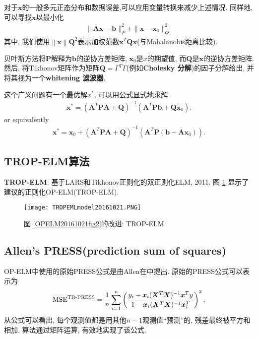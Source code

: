 对于$\bm x$的一般多元正态分布和数据误差,可以应用变量转换来减少上述情况. 同样地, 可以寻找$\bm x$以最小化
\begin{align}
    \|\bm A\bm x-\bm b\|_{P}^{2}+\|\bm x-\bm x_{0}\|_{Q}^{2}\,
\end{align}
其中, 我们使用$\left\|\bm x\right\|{\bm Q}^{2}$表示加权范数$\bm x^{T}\bm Q\bm x$(与Mahalanobis距离比较).

\begin{remark}
贝叶斯方法将$\bm P$解释为$\bm b$的逆协方差矩阵, $\bm x_0$是$x$的期望值, 而$\bm Q$是$\bm x$的逆协方差矩阵.
然后, 将Tikhonov矩阵作为矩阵$\displaystyle\bm Q=\Gamma^{T}\Gamma$(例如\textbf{Cholesky 分解})的因子分解给出, 并将其视为一个\textbf{whitening 滤波器}.
\end{remark}

这个广义问题有一个最优解$x^{*}$, 可以用公式显式地求解
\begin{align}
    \bm x^{*}=(\bm A^{T}\bm P\bm A+\bm Q)^{-1}(\bm A^{T}\bm P\bm b+\bm Q\bm x_{0}).
\end{align}
or equivalently
\begin{align}
    \bm x^{*}=\bm x_{0}+(\bm A^{T}\bm P\bm A+\bm Q)^{-1}(\bm A^{T}\bm P(\bm b-\bm A \bm x_{0})).
\end{align}
\subsection{TROP-ELM算法}
\textbf{TROP-ELM}: 基于LARS和Tikhonov正则化的双正则化ELM\cite{MichevanHeeswijk2011-30641}, 2011.
图 \ref{TROPEMLmodel20161021fig2} 显示了建议的正则化OP-ELM(TROP-ELM).
\begin{figure}[H]
    \begin{center}
    \texttt{[image: TROPEMLmodel20161021.PNG]}
    \end{center}
    \caption{图 \ref{OPELM20161021fig2}的改进: TROP-ELM.}
    \label{TROPEMLmodel20161021fig2}
\end{figure}
\subsection{Allen's PRESS(prediction sum of squares)}
OP-ELM中使用的原始PRESS公式是由Allen在\cite{MADavid1972}中提出. 原始的PRESS公式可以表示为
\begin{align}\label{AIC5eqn519}
  \textup{MSE}^{\textup{TR-PRESS}}=\frac 1 n \sum_{i=1}^n \left( \frac{y_i-\bm x_i(\bm X^T \bm X)^{-1}\bm x^T y}
       {1-\bm x_i(\bm X^T \bm X)^{-1}\bm x_i^T}\right)^2,
\end{align}
从公式可以看出, 每个观测值都是用其他$n-1$观测值“预测”的, 残差最终被平方和相加. 算法通过矩阵运算, 有效地实现了该公式.

